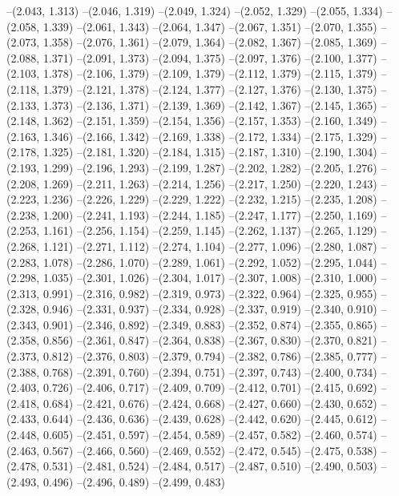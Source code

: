 --(2.043, 1.313)
--(2.046, 1.319)
--(2.049, 1.324)
--(2.052, 1.329)
--(2.055, 1.334)
--(2.058, 1.339)
--(2.061, 1.343)
--(2.064, 1.347)
--(2.067, 1.351)
--(2.070, 1.355)
--(2.073, 1.358)
--(2.076, 1.361)
--(2.079, 1.364)
--(2.082, 1.367)
--(2.085, 1.369)
--(2.088, 1.371)
--(2.091, 1.373)
--(2.094, 1.375)
--(2.097, 1.376)
--(2.100, 1.377)
--(2.103, 1.378)
--(2.106, 1.379)
--(2.109, 1.379)
--(2.112, 1.379)
--(2.115, 1.379)
--(2.118, 1.379)
--(2.121, 1.378)
--(2.124, 1.377)
--(2.127, 1.376)
--(2.130, 1.375)
--(2.133, 1.373)
--(2.136, 1.371)
--(2.139, 1.369)
--(2.142, 1.367)
--(2.145, 1.365)
--(2.148, 1.362)
--(2.151, 1.359)
--(2.154, 1.356)
--(2.157, 1.353)
--(2.160, 1.349)
--(2.163, 1.346)
--(2.166, 1.342)
--(2.169, 1.338)
--(2.172, 1.334)
--(2.175, 1.329)
--(2.178, 1.325)
--(2.181, 1.320)
--(2.184, 1.315)
--(2.187, 1.310)
--(2.190, 1.304)
--(2.193, 1.299)
--(2.196, 1.293)
--(2.199, 1.287)
--(2.202, 1.282)
--(2.205, 1.276)
--(2.208, 1.269)
--(2.211, 1.263)
--(2.214, 1.256)
--(2.217, 1.250)
--(2.220, 1.243)
--(2.223, 1.236)
--(2.226, 1.229)
--(2.229, 1.222)
--(2.232, 1.215)
--(2.235, 1.208)
--(2.238, 1.200)
--(2.241, 1.193)
--(2.244, 1.185)
--(2.247, 1.177)
--(2.250, 1.169)
--(2.253, 1.161)
--(2.256, 1.154)
--(2.259, 1.145)
--(2.262, 1.137)
--(2.265, 1.129)
--(2.268, 1.121)
--(2.271, 1.112)
--(2.274, 1.104)
--(2.277, 1.096)
--(2.280, 1.087)
--(2.283, 1.078)
--(2.286, 1.070)
--(2.289, 1.061)
--(2.292, 1.052)
--(2.295, 1.044)
--(2.298, 1.035)
--(2.301, 1.026)
--(2.304, 1.017)
--(2.307, 1.008)
--(2.310, 1.000)
--(2.313, 0.991)
--(2.316, 0.982)
--(2.319, 0.973)
--(2.322, 0.964)
--(2.325, 0.955)
--(2.328, 0.946)
--(2.331, 0.937)
--(2.334, 0.928)
--(2.337, 0.919)
--(2.340, 0.910)
--(2.343, 0.901)
--(2.346, 0.892)
--(2.349, 0.883)
--(2.352, 0.874)
--(2.355, 0.865)
--(2.358, 0.856)
--(2.361, 0.847)
--(2.364, 0.838)
--(2.367, 0.830)
--(2.370, 0.821)
--(2.373, 0.812)
--(2.376, 0.803)
--(2.379, 0.794)
--(2.382, 0.786)
--(2.385, 0.777)
--(2.388, 0.768)
--(2.391, 0.760)
--(2.394, 0.751)
--(2.397, 0.743)
--(2.400, 0.734)
--(2.403, 0.726)
--(2.406, 0.717)
--(2.409, 0.709)
--(2.412, 0.701)
--(2.415, 0.692)
--(2.418, 0.684)
--(2.421, 0.676)
--(2.424, 0.668)
--(2.427, 0.660)
--(2.430, 0.652)
--(2.433, 0.644)
--(2.436, 0.636)
--(2.439, 0.628)
--(2.442, 0.620)
--(2.445, 0.612)
--(2.448, 0.605)
--(2.451, 0.597)
--(2.454, 0.589)
--(2.457, 0.582)
--(2.460, 0.574)
--(2.463, 0.567)
--(2.466, 0.560)
--(2.469, 0.552)
--(2.472, 0.545)
--(2.475, 0.538)
--(2.478, 0.531)
--(2.481, 0.524)
--(2.484, 0.517)
--(2.487, 0.510)
--(2.490, 0.503)
--(2.493, 0.496)
--(2.496, 0.489)
--(2.499, 0.483)
